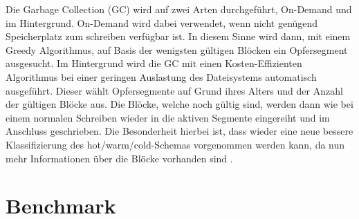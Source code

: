 \documentclass[11pt]{article}
\begin{document}
Die Garbage Collection (GC) wird auf zwei Arten durchgeführt, On-Demand und im Hintergrund. On-Demand wird dabei verwendet, wenn nicht genügend Speicherplatz zum schreiben verfügbar ist. In diesem Sinne wird dann, mit einem Greedy Algorithmus, auf Basis der wenigsten gültigen Blöcken ein Opfersegment ausgesucht. Im Hintergrund wird die GC mit einen Kosten-Effizienten Algorithmus bei einer geringen Auslastung des Dateisystems automatisch ausgeführt. Dieser wählt Opfersegmente auf Grund ihres Alters und der Anzahl der gültigen Blöcke aus. Die Blöcke, welche noch gültig sind, werden dann wie bei einem normalen Schreiben wieder in die aktiven Segmente eingereiht und im Anschluss geschrieben. Die Besonderheit hierbei ist, dass wieder eine neue bessere Klassifizierung des hot/warm/cold-Schemas vorgenommen werden kann, da nun mehr Informationen über die Blöcke vorhanden sind \cite{lee2015f2fs}.


\section{Benchmark}



\end{document}
